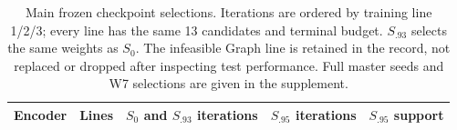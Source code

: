 \begin{table}[t]
\centering
\caption{Main frozen checkpoint selections. Iterations are ordered by training line 1/2/3; every line has the same 13 candidates and terminal budget. $S_{.93}$ selects the same weights as $S_0$. The infeasible Graph line is retained in the record, not replaced or dropped after inspecting test performance. Full master seeds and W7 selections are given in the supplement.}
\label{tab:checkpoint-selection}
\begingroup
\small
\setlength{\tabcolsep}{5pt}
\begin{tabular}{@{}lrccc@{}}
\toprule
Encoder & Lines & $S_0$ and $S_{.93}$ iterations & $S_{.95}$ iterations & $S_{.95}$ support \\
\midrule

\end{tabular}
\endgroup
\end{table}
